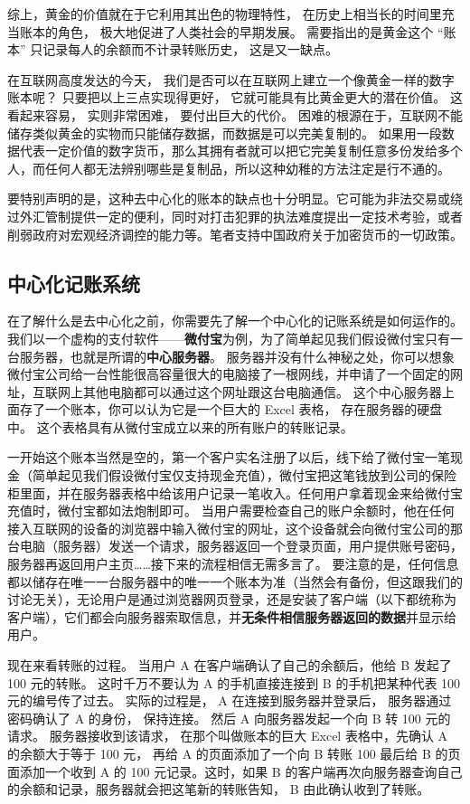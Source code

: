 综上，黄金的价值就在于它利用其出色的物理特性， 在历史上相当长的时间里充当账本的角色， 极大地促进了人类社会的早期发展。 需要指出的是黄金这个 “账本” 只记录每人的余额而不计录转账历史， 这是又一缺点。

在互联网高度发达的今天， 我们是否可以在互联网上建立一个像黄金一样的数字账本呢？ 只要把以上三点实现得更好， 它就可能具有比黄金更大的潜在价值。 这看起来容易， 实则非常困难， 要付出巨大的代价。 困难的根源在于，互联网不能储存类似黄金的实物而只能储存数据，而数据是可以完美复制的。 如果用一段数据代表一定价值的数字货币，那么其拥有者就可以把它完美复制任意多份发给多个人，而任何人都无法辨别哪些是复制品，所以这种幼稚的方法注定是行不通的。

要特别声明的是，这种去中心化的账本的缺点也十分明显。它可能为非法交易或绕过外汇管制提供一定的便利，同时对打击犯罪的执法难度提出一定技术考验，或者削弱政府对宏观经济调控的能力等。笔者支持中国政府关于加密货币的一切政策。

\subsection{中心化记账系统}
在了解什么是去中心化之前，你需要先了解一个中心化的记账系统是如何运作的。我们以一个虚构的支付软件——\textbf{微付宝}为例，为了简单起见我们假设微付宝只有一台服务器，也就是所谓的\textbf{中心服务器}。 服务器并没有什么神秘之处，你可以想象微付宝公司给一台性能很高容量很大的电脑接了一根网线，并申请了一个固定的网址，互联网上其他电脑都可以通过这个网址跟这台电脑通信。 这个中心服务器上面存了一个账本，你可以认为它是一个巨大的 Excel 表格， 存在服务器的硬盘中。 这个表格具有从微付宝成立以来的所有账户的转账记录。

一开始这个账本当然是空的，第一个客户实名注册了以后，线下给了微付宝一笔现金（简单起见我们假设微付宝仅支持现金充值），微付宝把这笔钱放到公司的保险柜里面，并在服务器表格中给该用户记录一笔收入。任何用户拿着现金来给微付宝充值时，微付宝都如法炮制即可。 当用户需要检查自己的账户余额时，他在任何接入互联网的设备的浏览器中输入微付宝的网址，这个设备就会向微付宝公司的那台电脑（服务器）发送一个请求，服务器返回一个登录页面，用户提供账号密码，服务器再返回用户主页……接下来的流程相信无需多言了。 要注意的是，任何信息都以储存在唯一一台服务器中的唯一一个账本为准（当然会有备份，但这跟我们的讨论无关），无论用户是通过浏览器网页登录，还是安装了客户端（以下都统称为客户端），它们都会向服务器索取信息，并\textbf{无条件相信服务器返回的数据}并显示给用户。

现在来看转账的过程。 当用户 A 在客户端确认了自己的余额后，他给 B 发起了 100 元的转账。 这时千万不要认为 A 的手机直接连接到 B 的手机把某种代表 100 元的编号传了过去。 实际的过程是， A 在连接到服务器并登录后， 服务器通过密码确认了 A 的身份， 保持连接。 然后 A 向服务器发起一个向 B 转 100 元的请求。 服务器接收到该请求， 在那个叫做账本的巨大 Excel 表格中，先确认 A 的余额大于等于 100 元， 再给 A 的页面添加了一个向 B 转账 100 最后给 B 的页面添加一个收到 A 的 100 元记录。这时，如果 B 的客户端再次向服务器查询自己的余额和记录，服务器就会把这笔新的转账告知， B 由此确认收到了转账。


